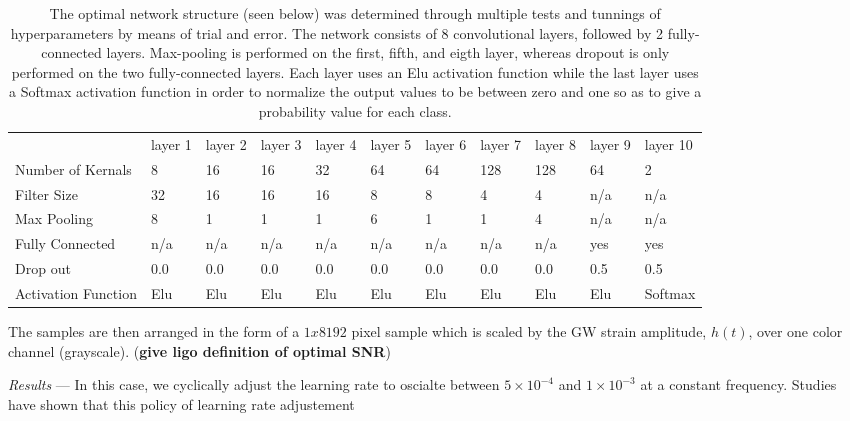 \documentclass[%
 amsmath,amssymb,
 aps,
 twocolumn,
]{revtex4-1}
\begin{document}
\begin{table}[]
\centering
\caption{The optimal network structure (seen below) was determined through multiple tests and tunnings of hyperparameters by means of trial and error. The network consists of 8 convolutional layers, followed by 2 fully-connected layers. Max-pooling is performed on the first, fifth, and eigth layer, whereas dropout is only performed on the two fully-connected layers. Each layer uses an Elu activation function while the last layer uses a Softmax activation function in order to normalize the output values to be between zero and one so as to give a probability value for each class. \\} 
\label{my-label}
\begin{tabular}{lllllllllll}
                    & layer 1 & layer 2 & layer 3 & layer 4 & layer 5 & layer 6 & layer 7 & layer 8 & layer 9 & layer 10 \\
Number of Kernals   & 8       & 16      & 16      & 32      & 64      & 64      & 128     & 128     & 64      & 2        \\
Filter Size         & 32      & 16      & 16      & 16      & 8       & 8       & 4       & 4       & n/a     & n/a      \\
Max Pooling         & 8       & 1       & 1       & 1       & 6       & 1       & 1       & 4       & n/a     & n/a      \\
Fully Connected     & n/a     & n/a     & n/a     & n/a     & n/a     & n/a     & n/a     & n/a     & yes     & yes      \\
Drop out            & 0.0     & 0.0     & 0.0     & 0.0     & 0.0     & 0.0     & 0.0     & 0.0     & 0.5     & 0.5      \\
Activation Function & Elu     & Elu     & Elu     & Elu     & Elu     & Elu     & Elu     & Elu     & Elu     & Softmax 
\end{tabular}
\end{table}

The samples are then arranged in the form of a $1 x 8192$ pixel sample which is scaled by the GW strain amplitude, $h(t)$, over one color channel (grayscale). (\textbf{give ligo definition of optimal SNR})

\textit{Results} --- In this case, we cyclically adjust the learning rate to oscialte between $5 \times 10^{-4}$ and $1 \times 10^{-3}$ at a constant frequency. Studies have shown that this policy of learning rate adjustement 
\end{document}
